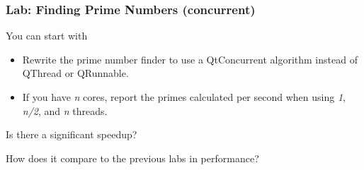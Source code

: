 
\begin{slide}
\frametitle{Lab: Finding Prime Numbers (concurrent)}
You can start with 
\begin{itemize}
\item Rewrite the prime number finder to use a QtConcurrent algorithm instead of
QThread or QRunnable.
\item If you have \textit{n} cores, report the primes calculated per second when
using \textit{1}, \textit{n/2}, and \textit{n} threads.
\end{itemize}

Is there a significant speedup?

How does it compare to the previous labs in performance?

\end{slide}


